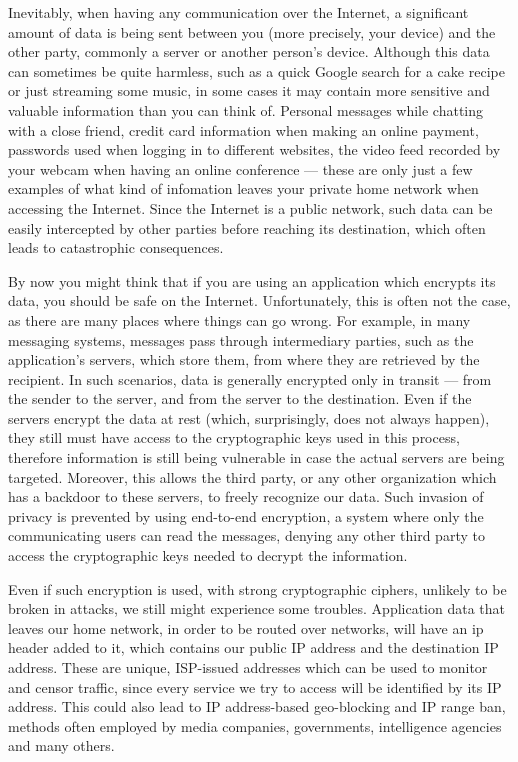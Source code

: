 \documentclass[a4paper,12pt]{report}
\begin{document}
		Inevitably, when having any communication over the Internet, a significant amount of data is being sent between you (more precisely, your device) and the other party, commonly a server or another person's device. Although this data can sometimes be quite harmless, such as a quick Google search for a cake recipe or just streaming some music, in some cases it may contain more sensitive and valuable information than you can think of. Personal messages while chatting with a close friend, credit card information when making an online payment, passwords used when logging in to different websites, the video feed recorded by your webcam when having an online conference --- these are only just a few examples of what kind of infomation leaves your private home network when accessing the Internet. Since the Internet is a public network, such data can be easily intercepted by other parties before reaching its destination, which often leads to catastrophic consequences.
		
		By now you might think that if you are using an application which encrypts its data, you should be safe on the Internet. Unfortunately, this is often not the case, as there are many places where things can go wrong. For example, in many messaging systems, messages pass through intermediary parties, such as the application's servers, which store them, from where they are retrieved by the recipient. In such scenarios, data is generally encrypted only in transit --- from the sender to the server, and from the server to the destination. Even if the servers encrypt the data at rest (which, surprisingly, does not always happen), they still must have access to the cryptographic keys used in this process, therefore information is still being vulnerable in case the actual servers are being targeted. Moreover, this allows the third party, or any other organization which has a backdoor to these servers, to freely recognize our data. Such invasion of privacy is prevented by using end-to-end encryption, a system where only the communicating users can read the messages, denying any other third party to access the cryptographic keys needed to decrypt the information.
		
		Even if such encryption is used, with strong cryptographic ciphers, unlikely to be broken in attacks, we still might experience some troubles. Application data that leaves our home network, in order to be routed over networks, will have an \acrfull{ip} header added to it, which contains our public IP address and the destination IP address. These are unique, ISP-issued addresses which can be used to monitor and censor traffic, since every service we try to access will be identified by its IP address. This could also lead to IP address-based geo-blocking and IP range ban, methods often employed by media companies, governments, intelligence agencies and many others.
		
\end{document}
